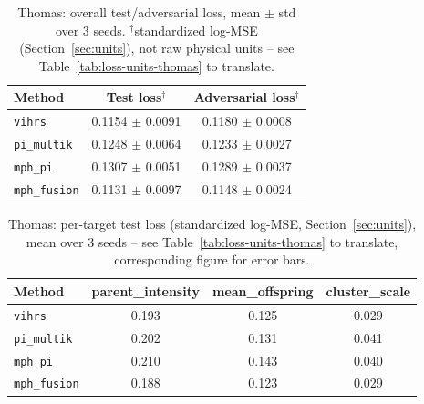 \begin{table}[htbp]
\centering
\small
\begin{tabular}{lcc}
\toprule
Method & Test loss$^\dagger$ & Adversarial loss$^\dagger$ \\
\midrule
\texttt{vihrs} & 0.1154 $\pm$ 0.0091 & 0.1180 $\pm$ 0.0008 \\
\texttt{pi\_multik} & 0.1248 $\pm$ 0.0064 & 0.1233 $\pm$ 0.0027 \\
\texttt{mph\_pi} & 0.1307 $\pm$ 0.0051 & 0.1289 $\pm$ 0.0037 \\
\texttt{mph\_fusion} & 0.1131 $\pm$ 0.0097 & 0.1148 $\pm$ 0.0024 \\
\bottomrule
\end{tabular}
\caption{Thomas: overall test/adversarial loss, mean $\pm$ std over 3 seeds. $^\dagger$standardized log-MSE (Section~\ref{sec:units}), not raw physical units -- see Table~\ref{tab:loss-units-thomas} to translate.}
\label{tab:thomas-overall}
\end{table}

\begin{table}[htbp]
\centering
\small
\begin{tabular}{lccc}
\toprule
Method & parent\_intensity & mean\_offspring & cluster\_scale \\
\midrule
\texttt{vihrs} & 0.193 & 0.125 & 0.029 \\
\texttt{pi\_multik} & 0.202 & 0.131 & 0.041 \\
\texttt{mph\_pi} & 0.210 & 0.143 & 0.040 \\
\texttt{mph\_fusion} & 0.188 & 0.123 & 0.029 \\
\bottomrule
\end{tabular}
\caption{Thomas: per-target test loss (standardized log-MSE, Section~\ref{sec:units}), mean over 3 seeds -- see Table~\ref{tab:loss-units-thomas} to translate, corresponding figure for error bars.}
\label{tab:thomas-per-target}
\end{table}